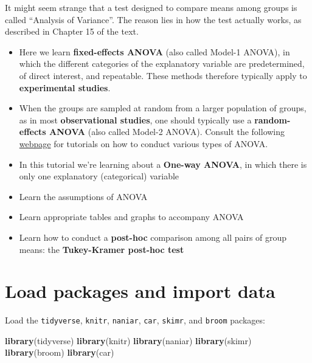\documentclass[
]{book}
\newenvironment{Shaded}{\begin{snugshade}}{\end{snugshade}}
\newcommand{\FunctionTok}[1]{\textcolor[rgb]{0.13,0.29,0.53}{\textbf{#1}}}
\newcommand{\NormalTok}[1]{#1}
\providecommand{\tightlist}{%
  \setlength{\itemsep}{0pt}\setlength{\parskip}{0pt}}
\begin{document}
It might seem strange that a test designed to compare means among groups is called ``Analysis of Variance''. The reason lies in how the test actually works, as described in Chapter 15 of the text.

\begin{itemize}
\tightlist
\item
  Here we learn \textbf{fixed-effects ANOVA} (also called Model-1 ANOVA), in which the different categories of the explanatory variable are predetermined, of direct interest, and repeatable. These methods therefore typically apply to \textbf{experimental studies}.\\
\item
  When the groups are sampled at random from a larger population of groups, as in most \textbf{observational studies}, one should typically use a \textbf{random-effects ANOVA} (also called Model-2 ANOVA). Consult the following \href{https://whitlockschluter3e.zoology.ubc.ca/RExamples/Rcode_Chapter_15.html}{webpage} for tutorials on how to conduct various types of ANOVA.
\item
  In this tutorial we're learning about a \textbf{One-way ANOVA}, in which there is only one explanatory (categorical) variable
\item
  Learn the assumptions of ANOVA
\item
  Learn appropriate tables and graphs to accompany ANOVA
\item
  Learn how to conduct a \textbf{post-hoc} comparison among all pairs of group means: the \textbf{Tukey-Kramer post-hoc test}
\end{itemize}

\section{Load packages and import data}\label{anova_packages_data}

Load the \texttt{tidyverse}, \texttt{knitr}, \texttt{naniar}, \texttt{car}, \texttt{skimr}, and \texttt{broom} packages:

\begin{Shaded}
\begin{Highlighting}[]
\FunctionTok{library}\NormalTok{(tidyverse)}
\FunctionTok{library}\NormalTok{(knitr)}
\FunctionTok{library}\NormalTok{(naniar)}
\FunctionTok{library}\NormalTok{(skimr)}
\FunctionTok{library}\NormalTok{(broom)}
\FunctionTok{library}\NormalTok{(car)}
\end{Highlighting}
\end{Shaded}
\end{document}
